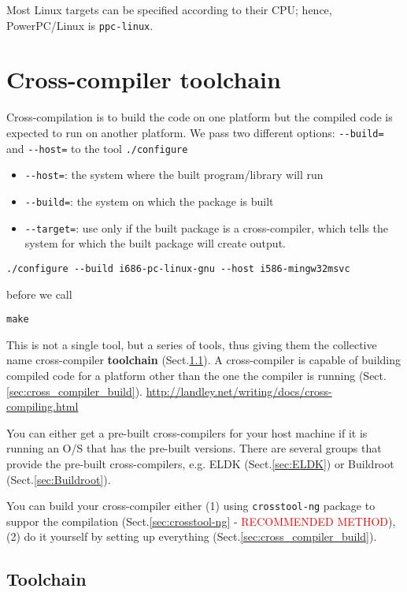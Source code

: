 Most Linux targets can be specified according to their CPU; hence, PowerPC/Linux
is \verb!ppc-linux!. 



\section{Cross-compiler toolchain}
\label{sec:cross_compiler}


Cross-compilation is to build the code on one platform but the compiled code is
expected to run on another platform. We pass two different
options: \verb!--build=! and \verb!--host=! to the tool \verb!./configure!
\begin{itemize}
  \item \verb!--host=!: the system where the built program/library will run
  \item \verb!--build=!: the system on which the package is built
  \item \verb!--target=!: use only if the built package is a cross-compiler,
  which tells the system for which the built package will create output.
\end{itemize}

\begin{verbatim}
./configure --build i686-pc-linux-gnu --host i586-mingw32msvc
\end{verbatim}
before we call
\begin{verbatim}
make
\end{verbatim}

This is not a single tool, but a series of tools, thus giving them the
collective name cross-compiler {\bf toolchain} (Sect.\ref{sec:toolchain}).  
A cross-compiler is capable of building compiled code for a platform
other than the one the compiler is running
(Sect.\ref{sec:cross_compiler_build}).
\url{http://landley.net/writing/docs/cross-compiling.html}


You can either get a pre-built cross-compilers for your host machine if it is
running an O/S that has the pre-built versions.
There are several groups that provide the pre-built cross-compilers, e.g. ELDK
(Sect.\ref{sec:ELDK}) or Buildroot (Sect.\ref{sec:Buildroot}).


You can build your cross-compiler either (1) using \verb!crosstool-ng! package
to suppor the compilation (Sect.\ref{sec:crosstool-ng} -
\textcolor{red}{RECOMMENDED METHOD}), (2) do it yourself by setting up
everything (Sect.\ref{sec:cross_compiler_build}).


\subsection{Toolchain}
\label{sec:toolchain}


